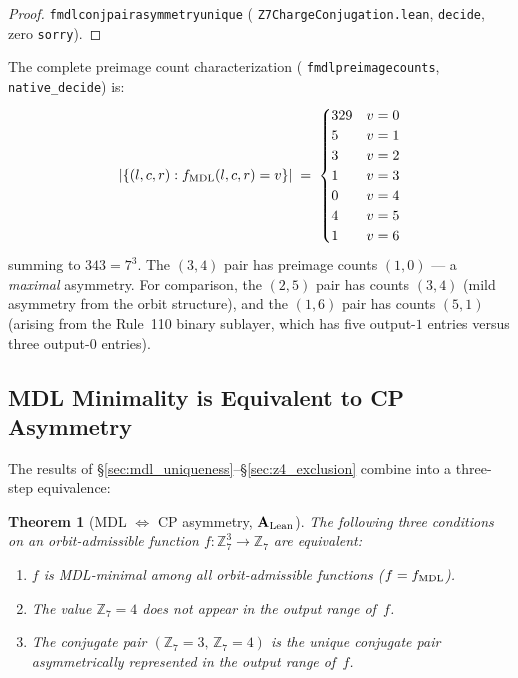 \documentclass[11pt]{article}
\newtheorem{theorem}{Theorem}[section]
\theoremstyle{remark}
\newcommand{\lean}[1]{%
  \penalty-100
  \begingroup\def\_{\textunderscore\allowbreak}\texttt{#1}\endgroup}
\newcommand{\CatAL}{\ensuremath{\textbf{A}_{\rm Lean}}}
\begin{document}
\begin{proof}
\lean{fmdl\_conj\_pair\_asymmetry\_unique} (\lean{Z7ChargeConjugation.lean},
\texttt{decide}, zero \texttt{sorry}).
\end{proof}

The complete preimage count characterization (\lean{fmdl\_preimage\_counts},
\texttt{native\_decide}) is:
\begin{align*}
|\{(l,c,r) : f_{\rm MDL}(l,c,r) = v\}|
\;=\;
\begin{cases}
329 & v = 0 \\
5   & v = 1 \\
3   & v = 2 \\
1   & v = 3 \\
0   & v = 4 \\
4   & v = 5 \\
1   & v = 6
\end{cases}
\end{align*}
summing to $343 = 7^3$.
The $(3,4)$ pair has preimage counts $(1, 0)$ --- a \emph{maximal} asymmetry.
For comparison, the $(2,5)$ pair has counts $(3, 4)$ (mild asymmetry from the orbit structure),
and the $(1,6)$ pair has counts $(5, 1)$ (arising from the Rule~110 binary sublayer, which has
five output-$1$ entries versus three output-$0$ entries).

\subsection{MDL Minimality is Equivalent to CP Asymmetry}
\label{sec:mdl_eq_cp}

The results of \S\ref{sec:mdl_uniqueness}--\S\ref{sec:z4_exclusion} combine into
a three-step equivalence:

\begin{theorem}[MDL $\Leftrightarrow$ CP asymmetry, $\CatAL$]\label{thm:mdl_cp_equiv}
The following three conditions on an orbit-admissible function $f: \mathbb{Z}_7^3 \to \mathbb{Z}_7$
are equivalent:
\begin{enumerate}[label=(\roman*)]
\item $f$ is MDL-minimal among all orbit-admissible functions ($f = f_{\rm MDL}$).
\item The value $\mathbb{Z}_7 = 4$ does not appear in the output range of~$f$.
\item The conjugate pair $(\mathbb{Z}_7 = 3,\, \mathbb{Z}_7 = 4)$ is the unique conjugate
pair asymmetrically represented in the output range of~$f$.
\end{enumerate}
\end{theorem}
\end{document}
